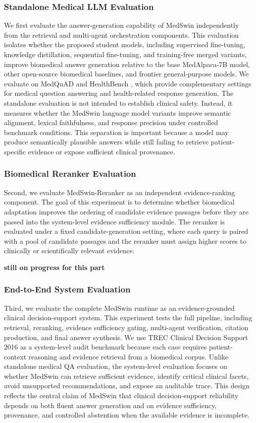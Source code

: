 \documentclass[conference]{IEEEtran}
\begin{document}
\subsubsection{Standalone Medical LLM Evaluation}
We first evaluate the answer-generation capability of MedSwin independently from the retrieval and multi-agent orchestration components. This evaluation isolates whether the proposed student models, including supervised fine-tuning, knowledge distillation, sequential fine-tuning, and training-free merged variants, improve biomedical answer generation relative to the base MedAlpaca-7B model, other open-source biomedical baselines, and frontier general-purpose models. We evaluate on MedQuAD \cite{ben2019question} and HealthBench \cite{arora2025healthbench}, which provide complementary settings for medical question answering and health-related response generation. The standalone evaluation is not intended to establish clinical safety. Instead, it measures whether the MedSwin language model variants improve semantic alignment, lexical faithfulness, and response precision under controlled benchmark conditions. This separation is important because a model may produce semantically plausible answers while still failing to retrieve patient-specific evidence or expose sufficient clinical provenance.

\subsubsection{Biomedical Reranker Evaluation}
Second, we evaluate MedSwin-Reranker as an independent evidence-ranking component. The goal of this experiment is to determine whether biomedical adaptation improves the ordering of candidate evidence passages before they are passed into the system-level evidence sufficiency module. The reranker is evaluated under a fixed candidate-generation setting, where each query is paired with a pool of candidate passages and the reranker must assign higher scores to clinically or scientifically relevant evidence. 

\textbf{still on progress for this part}

\subsubsection{End-to-End System Evaluation}
Third, we evaluate the complete MedSwin runtime as an evidence-grounded clinical decision-support system. This experiment tests the full pipeline, including retrieval, reranking, evidence sufficiency gating, multi-agent verification, citation production, and final answer synthesis. We use TREC Clinical Decision Support 2016 as a system-level audit benchmark because each case requires patient-context reasoning and evidence retrieval from a biomedical corpus. Unlike standalone medical QA evaluation, the system-level evaluation focuses on whether MedSwin can retrieve sufficient evidence, identify critical clinical facets, avoid unsupported recommendations, and expose an auditable trace. This design reflects the central claim of MedSwin that clinical decision-support reliability depends on both fluent answer generation and on evidence sufficiency, provenance, and controlled abstention when the available evidence is incomplete.
\end{document}
